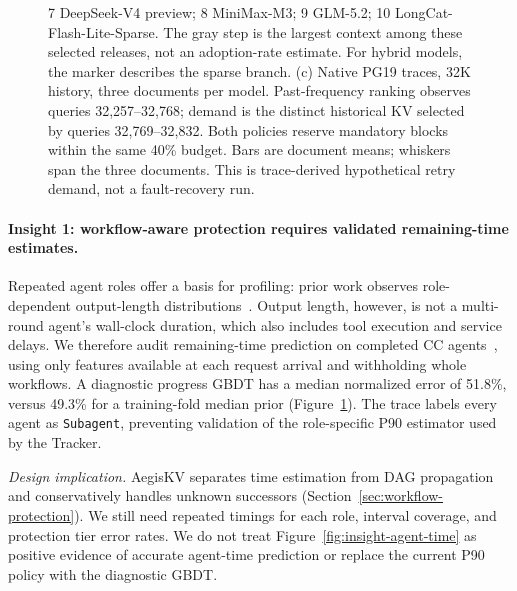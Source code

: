 \begin{figure}[t]
{    7 DeepSeek-V4 preview; 8 MiniMax-M3; 9 GLM-5.2;
    10 LongCat-Flash-Lite-Sparse. The gray step is the largest context
    among these selected releases, not an adoption-rate estimate.
    For hybrid models, the marker describes the sparse branch.
    (c) Native PG19 traces, 32K history, three documents per model.
    Past-frequency ranking observes queries 32,257--32,768; demand is
    the distinct historical KV selected by queries 32,769--32,832.
    Both policies reserve mandatory blocks within the same 40\% budget.
    Bars are document means; whiskers span the three documents. This is
    trace-derived hypothetical retry demand, not a fault-recovery run.}
  \label{fig:design-insights}
\end{figure}

\paragraph{Insight 1: workflow-aware protection requires validated
remaining-time estimates.}
Repeated agent roles offer a basis for profiling: prior work observes
role-dependent output-length distributions~\cite{yu2026pythia}.
Output length, however, is not a multi-round agent's wall-clock duration,
which also includes tool execution and service delays. We therefore
audit remaining-time prediction on completed CC agents~\cite{semianalysis2026cctraces},
using only features available at each request arrival and withholding
whole workflows. A diagnostic progress GBDT has a median normalized
error of 51.8\%, versus 49.3\% for a training-fold median prior
(Figure~\ref{fig:design-insights}).
The trace labels every agent as \texttt{Subagent}, preventing validation
of the role-specific P90 estimator used by the Tracker.

\emph{Design implication.} AegisKV separates time estimation from DAG
propagation and conservatively handles unknown successors
(Section~\ref{sec:workflow-protection}). We still need repeated timings
for each role, interval coverage, and protection tier error rates.
We do not treat Figure~\ref{fig:insight-agent-time} as
positive evidence of accurate agent-time prediction or replace the
current P90 policy with the diagnostic GBDT.

